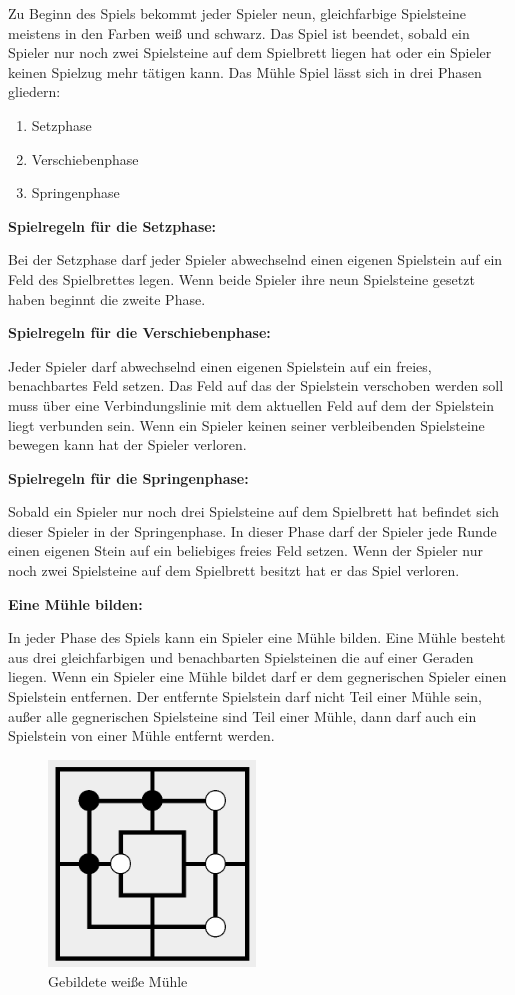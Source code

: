 \documentclass[oneside]{ausarbeitung}
\begin{document}
Zu Beginn des Spiels bekommt jeder Spieler neun, gleichfarbige Spielsteine meistens in den Farben weiß und schwarz. Das Spiel ist beendet, sobald ein Spieler nur noch zwei Spielsteine auf dem Spielbrett liegen hat oder ein Spieler keinen Spielzug mehr tätigen kann. Das Mühle Spiel lässt sich in drei Phasen gliedern:

\begin{enumerate}
\item Setzphase
\item Verschiebenphase
\item Springenphase
\end{enumerate}

\textbf{Spielregeln für die Setzphase:}

Bei der Setzphase darf jeder Spieler abwechselnd einen eigenen Spielstein auf ein Feld des Spielbrettes legen. Wenn beide Spieler ihre neun Spielsteine gesetzt haben beginnt die zweite Phase.

\textbf{Spielregeln für die Verschiebenphase:}

Jeder Spieler darf abwechselnd einen eigenen Spielstein auf ein freies, benachbartes Feld setzen. Das Feld auf das der Spielstein verschoben werden soll muss über eine Verbindungslinie mit dem aktuellen Feld auf dem der Spielstein liegt verbunden sein. Wenn ein Spieler keinen seiner verbleibenden Spielsteine bewegen kann hat der Spieler verloren.

\textbf{Spielregeln für die Springenphase:}

Sobald ein Spieler nur noch drei Spielsteine auf dem Spielbrett hat befindet sich dieser Spieler in der Springenphase. In dieser Phase darf der Spieler jede Runde einen eigenen Stein auf ein beliebiges freies Feld setzen. Wenn der Spieler nur noch zwei Spielsteine auf dem Spielbrett besitzt hat er das Spiel verloren.

\textbf{Eine Mühle bilden:}

In jeder Phase des Spiels kann ein Spieler eine Mühle bilden. Eine Mühle besteht aus drei gleichfarbigen und benachbarten Spielsteinen die auf einer Geraden liegen. Wenn ein Spieler eine Mühle bildet darf er dem gegnerischen Spieler einen Spielstein entfernen. Der entfernte Spielstein darf nicht Teil einer Mühle sein, außer alle gegnerischen Spielsteine sind Teil einer Mühle, dann darf auch ein Spielstein von einer Mühle entfernt werden.

\begin{figure}[ht]
	\centering
	\includegraphics[width=5.5cm,height=5.5cm]{images/mill.png}
	\caption[Gebildete weiße Mühle]{Gebildete weiße Mühle}
\end{figure}
\end{document}
